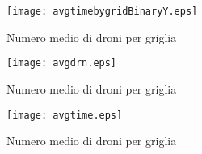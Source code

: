 %
%
\begin{figure}
	\begin{center}
		\texttt{[image: avgtimebygridBinaryY.eps]}
	\end{center}
	\caption{Numero medio di droni per griglia} \label{fig:avgtimebygridBinaryY}
\end{figure}
%
%
\begin{figure}
	\begin{center}
		\texttt{[image: avgdrn.eps]}
	\end{center}
	\caption{Numero medio di droni per griglia} \label{fig:avgdrn}
\end{figure}
%

%
\begin{figure}
	\begin{center}
		\texttt{[image: avgtime.eps]}
	\end{center}
	\caption{Numero medio di droni per griglia} \label{fig:avgtime}
\end{figure}
%
